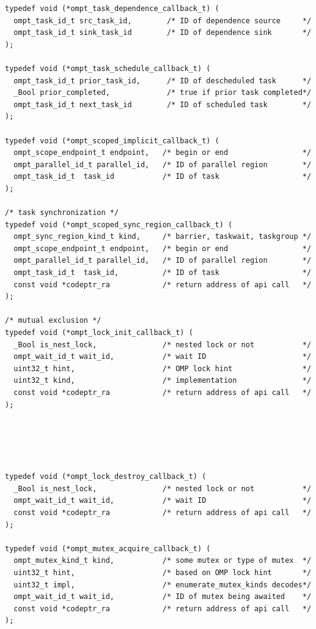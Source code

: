 \documentclass{article}
\begin{document}
\begin{verbatim}
typedef void (*ompt_task_dependence_callback_t) (
  ompt_task_id_t src_task_id,        /* ID of dependence source     */
  ompt_task_id_t sink_task_id        /* ID of dependence sink       */
);

typedef void (*ompt_task_schedule_callback_t) (
  ompt_task_id_t prior_task_id,      /* ID of descheduled task      */
  _Bool prior_completed,             /* true if prior task completed*/
  ompt_task_id_t next_task_id        /* ID of scheduled task        */
);

typedef void (*ompt_scoped_implicit_callback_t) ( 
  ompt_scope_endpoint_t endpoint,   /* begin or end                 */
  ompt_parallel_id_t parallel_id,   /* ID of parallel region        */
  ompt_task_id_t  task_id           /* ID of task                   */
);

/* task synchronization */
typedef void (*ompt_scoped_sync_region_callback_t) ( 
  ompt_sync_region_kind_t kind,     /* barrier, taskwait, taskgroup */
  ompt_scope_endpoint_t endpoint,   /* begin or end                 */ 
  ompt_parallel_id_t parallel_id,   /* ID of parallel region        */
  ompt_task_id_t  task_id,          /* ID of task                   */
  const void *codeptr_ra            /* return address of api call   */
);

/* mutual exclusion */
typedef void (*ompt_lock_init_callback_t) (
  _Bool is_nest_lock,               /* nested lock or not           */
  ompt_wait_id_t wait_id,           /* wait ID                      */
  uint32_t hint,                    /* OMP lock hint                */
  uint32_t kind,                    /* implementation               */
  const void *codeptr_ra            /* return address of api call   */
);





typedef void (*ompt_lock_destroy_callback_t) (
  _Bool is_nest_lock,               /* nested lock or not           */
  ompt_wait_id_t wait_id,           /* wait ID                      */
  const void *codeptr_ra            /* return address of api call   */
);

typedef void (*ompt_mutex_acquire_callback_t) ( 
  ompt_mutex_kind_t kind,           /* some mutex or type of mutex  */
  uint32_t hint,                    /* based on OMP lock hint       */
  uint32_t impl,                    /* enumerate_mutex_kinds decodes*/
  ompt_wait_id_t wait_id,           /* ID of mutex being awaited    */
  const void *codeptr_ra            /* return address of api call   */          
);


\end{verbatim}
\end{document}
